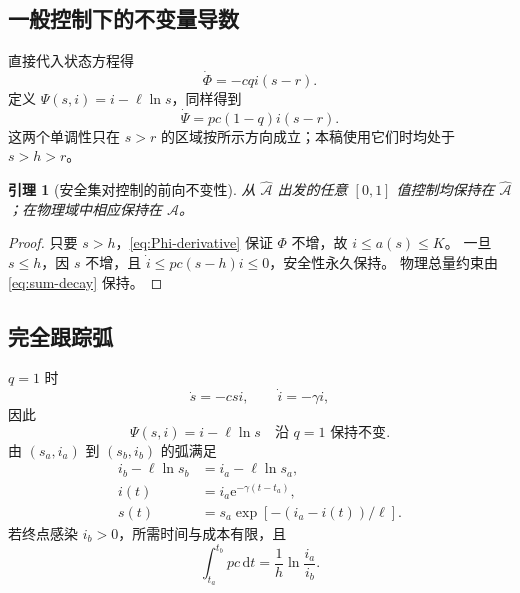 \documentclass[11pt,a4paper,UTF8]{ctexart}
\newtheorem{lemma}[theorem]{引理}
\theoremstyle{definition}
\newcommand{\Acal}{\mathcal A}
\newcommand{\dd}{\,\mathrm d}
\newcommand{\e}{\mathrm e}
\begin{document}
\subsection{一般控制下的不变量导数}
直接代入状态方程得
\begin{equation}
\boxed{\dot\Phi=-cqi(s-r).}
\label{eq:Phi-derivative}
\end{equation}
定义 $\Psi(s,i)=i-\ell\ln s$，同样得到
\begin{equation}
\dot\Psi=pc(1-q)i(s-r).
\label{eq:Psi-derivative}
\end{equation}
这两个单调性只在 $s>r$ 的区域按所示方向成立；本稿使用它们时均处于 $s>h>r$。

\begin{lemma}[安全集对控制的前向不变性]
\label{lem:safe-invariant}
从 $\widehat{\Acal}$ 出发的任意 $[0,1]$ 值控制均保持在 $\widehat{\Acal}$；在物理域中相应保持在 $\Acal$。
\end{lemma}
\begin{proof}
只要 $s>h$，\eqref{eq:Phi-derivative} 保证 $\Phi$ 不增，故 $i\le a(s)\le K$。
一旦 $s\le h$，因 $s$ 不增，且 $\dot i\le pc(s-h)i\le0$，安全性永久保持。
物理总量约束由 \eqref{eq:sum-decay} 保持。
\end{proof}

\subsection{完全跟踪弧}
$q=1$ 时
\begin{equation}
\dot s=-csi,\qquad \dot i=-\gamma i,
\label{eq:q1-system}
\end{equation}
因此
\begin{equation}
\boxed{\Psi(s,i)=i-\ell\ln s\quad\text{沿 }q=1\text{ 保持不变}.}
\label{eq:Psi}
\end{equation}
由 $(s_a,i_a)$ 到 $(s_b,i_b)$ 的弧满足
\begin{align}
i_b-\ell\ln s_b&=i_a-\ell\ln s_a,
\label{eq:q1-characteristic}\\
i(t)&=i_a\e^{-\gamma(t-t_a)},
\label{eq:q1-i}\\
s(t)&=s_a\exp[-(i_a-i(t))/\ell].
\label{eq:q1-s}
\end{align}
若终点感染 $i_b>0$，所需时间与成本有限，且
\begin{equation}
\int_{t_a}^{t_b}pc\dd t=\frac1h\ln\frac{i_a}{i_b}.
\label{eq:q1-cost}
\end{equation}
\end{document}
